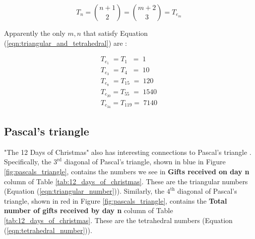 \documentclass{article}
\theoremstyle{definition}
\begin{document}
\bigskip
\begin{equation}
T_{n} = \binom{n+1}{2} = \binom{m+2}{3} = T_{e_m}
\label{eqn:triangular_and_tetrahedral}
\end{equation}

\vspace{1.5em}
\noindent
Apparently the only $m,n$ that satisfy Equation 
(\ref{eqn:triangular_and_tetrahedral})
are \cite{A027568}:

\medskip
\begin{equation*}
\begin{array}{llllll}
T_{e_1}    \; = T_{1}   \;\; = \; 1    \\
T_{e_3}    \; = T_{4}   \;\; = \; 10   \\
T_{e_8}    \; = T_{15}    \; = \; 120  \\
T_{e_{20}}    = T_{55}    \; = \; 1540 \\
T_{e_{34}}    = T_{119}      = \; 7140 
\end{array}
\end{equation*}

\vspace{0.25em}
\subsection{Pascal's triangle}
\label{subsec:pascals_triangle}
"The 12 Days of Christmas" also has interesting connections to
Pascal's triangle \cite{wiki:pascals_triangle}. Specifically, the
$3^{\text{rd}}$ diagonal of Pascal's triangle, shown in blue in
Figure \ref{fig:pascals_triangle}, contains the numbers we see in
{\bf Gifts received on day n} column of Table
\ref{tab:12_days_of_christmas}. These are the triangular numbers
(Equation (\ref{eqn:triangular_number})).  Similarly, the
$4^{\text{th}}$ diagonal of Pascal's triangle, shown in red in
Figure \ref{fig:pascals_triangle}, contains the {\bf Total number
of gifts received by day n} column of Table
\ref{tab:12_days_of_christmas}. These are the tetrahedral numbers
(Equation (\ref{eqn:tetrahedral_number})).
\end{document}
